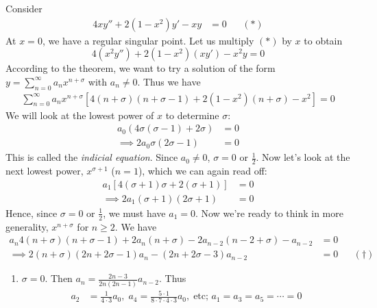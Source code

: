 \documentclass{../template/note}
\begin{document}
    
    
    \begin{example}
        Consider
        \begin{align*}
            4xy''+2(1-x^2)y'-xy&=0 && (*)
        \end{align*}
        At \(x=0\), we have a regular singular point. Let us multiply \((*)\) by \(x\) to obtain
        \[
            4(x^2y'')+2(1-x^2)(xy')-x^2y=0
        \]
        According to the theorem, we want to try a solution of the form \(y = \sum_{n=0}^\infty a_n x^{n+\sigma}\) with \(a_n \neq 0\). Thus we have
        \begin{align*}
            \sum_{n=0}^\infty a_n x^{n+\sigma}[4(n+\sigma)(n+\sigma-1)+2(1-x^2)(n+\sigma)-x^2]=0
        \end{align*}
        We will look at the lowest power of \(x\) to determine \(\sigma\):
        \begin{align*}
            a_0(4\sigma(\sigma-1)+2\sigma)&=0 \\
            \implies 2a_0\sigma(2\sigma-1)&=0
        \end{align*}
        This is called the \emph{indicial equation}. Since \(a_0 \neq 0\), \(\sigma = 0\) or \(\frac{1}{2}\). Now let's look at the next lowest power, \(x^{\sigma+1}\) (\(n=1\)), which we can again read off:
        \begin{align*}
            a_1[4(\sigma+1)\sigma+2(\sigma+1)]&=0 \\
            \implies 2a_1(\sigma+1)(2\sigma+1)&=0
        \end{align*}
        Hence, since \(\sigma = 0\) or \(\frac{1}{2}\), we must have \(a_1 = 0\). Now we're ready to think in more generality, \(x^{n+\sigma}\) for \(n \geq 2\). We have
        \begin{align*}
            a_n4(n+\sigma)(n+\sigma-1)+2a_n(n+\sigma)-2a_{n-2}(n-2+\sigma)-a_{n-2}&=0 \\
            \implies 2(n+\sigma)(2n+2\sigma-1)a_n - (2n+2\sigma-3)a_{n-2} &= 0 && (\dagger)
        \end{align*}
        \begin{enumerate}[label=\protect\circled{\arabic*}]
            \item \(\sigma=0\). Then \(a_n = \frac{2n-3}{2n(2n-1)}a_{n-2}\). Thus
            \begin{align*}
                a_2 &= \frac{1}{4 \cdot 3}a_0,\; a_4 = \frac{5 \cdot 1}{8 \cdot 7 \cdot 4 \cdot 3}a_0, \; \text{etc; } a_1 = a_3 = a_5 = \cdots = 0 \\

\end{align*}
\end{enumerate}
\end{example}
\end{document}
